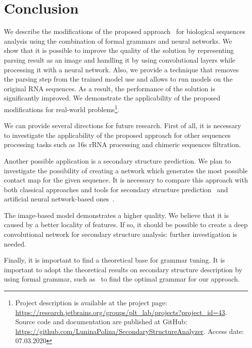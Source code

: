 \section{Conclusion}
We describe the modifications of the proposed approach~\cite{grigorevcomposition} for biological sequences analysis using the combination of formal grammars and neural networks.
We show that it is possible to improve the quality of the solution by representing parsing result as an image and handling it by using convolutional layers while processing it with a neural network.
Also, we provide a technique that removes the parsing step from the trained model use and allows to run models on the original RNA sequences.
As a result, the performance of the solution is significantly improved.
We demonstrate the applicability of the proposed modifications for real-world problems\footnote{
Project description is available at the project page: \url{https://research.jetbrains.org/groups/plt\_lab/projects?project\_id=43}.
Source code and documentation are published at GitHub: \url{https://github.com/LuninaPolina/SecondaryStructureAnalyzer}. Access date: 07.03.2020}.

We can provide several directions for future research.
First of all, it is necessary to investigate the applicability of the proposed approach for other sequences processing tasks such as 16s rRNA processing and chimeric sequences filtration.

Another possible application is a secondary structure prediction.
We plan to investigate the possibility of creating a network which generates the most possible contact map for the given sequence.
It is necessary to compare this approach with both classical approaches and tools for secondary structure prediction~\cite{jabbari2014fast,jabbari2007hfold,sato2009centroidfold,10.1093/bioinformatics/btr215} and artificial neural network-based ones~\cite{Lu2019,Singh2019}.

The image-based model demonstrates a higher quality.
We believe that it is caused by a better locality of features.
If so, it should be possible to create a deep convolutional network for secondary structure analysis: further investigation is needed.

Finally, it is important to find a theoretical base for grammar tuning.
It is important to adopt the theoretical results on secondary structure description by using formal grammar, such as~\cite{MQbioinformatics19} to find the optimal grammar for our approach.

